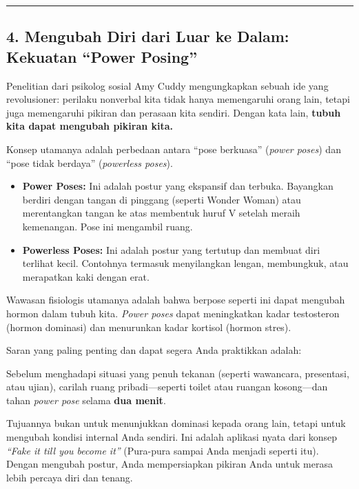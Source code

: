 \documentclass[
  letterpaper,
  DIV=11,
  numbers=noendperiod]{scrreprt}
\begin{document}
\begin{center}\rule{0.5\linewidth}{0.5pt}\end{center}

\subsection{4. Mengubah Diri dari Luar ke Dalam: Kekuatan ``Power
Posing''}\label{mengubah-diri-dari-luar-ke-dalam-kekuatan-power-posing}

Penelitian dari psikolog sosial Amy Cuddy mengungkapkan sebuah ide yang
revolusioner: perilaku nonverbal kita tidak hanya memengaruhi orang
lain, tetapi juga memengaruhi pikiran dan perasaan kita sendiri. Dengan
kata lain, \textbf{tubuh kita dapat mengubah pikiran kita.}

Konsep utamanya adalah perbedaan antara ``pose berkuasa'' (\emph{power
poses}) dan ``pose tidak berdaya'' (\emph{powerless poses}).

\begin{itemize}
\item
  \textbf{Power Poses:} Ini adalah postur yang ekspansif dan terbuka.
  Bayangkan berdiri dengan tangan di pinggang (seperti Wonder Woman)
  atau merentangkan tangan ke atas membentuk huruf V setelah meraih
  kemenangan. Pose ini mengambil ruang.
\item
  \textbf{Powerless Poses:} Ini adalah postur yang tertutup dan membuat
  diri terlihat kecil. Contohnya termasuk menyilangkan lengan,
  membungkuk, atau merapatkan kaki dengan erat.
\end{itemize}

Wawasan fisiologis utamanya adalah bahwa berpose seperti ini dapat
mengubah hormon dalam tubuh kita. \emph{Power poses} dapat meningkatkan
kadar testosteron (hormon dominasi) dan menurunkan kadar kortisol
(hormon stres).

Saran yang paling penting dan dapat segera Anda praktikkan adalah:

Sebelum menghadapi situasi yang penuh tekanan (seperti wawancara,
presentasi, atau ujian), carilah ruang pribadi---seperti toilet atau
ruangan kosong---dan tahan \emph{power pose} selama \textbf{dua menit}.

Tujuannya bukan untuk menunjukkan dominasi kepada orang lain, tetapi
untuk mengubah kondisi internal Anda sendiri. Ini adalah aplikasi nyata
dari konsep \emph{``Fake it till you become it''} (Pura-pura sampai Anda
menjadi seperti itu). Dengan mengubah postur, Anda mempersiapkan pikiran
Anda untuk merasa lebih percaya diri dan tenang.
\end{document}
